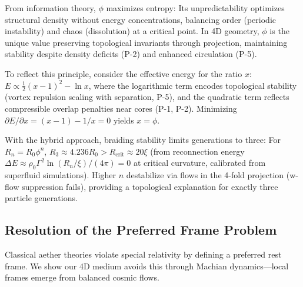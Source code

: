 From information theory, $\phi$ maximizes entropy: Its unpredictability optimizes structural density without energy concentrations, balancing order (periodic instability) and chaos (dissolution) at a critical point. In 4D geometry, $\phi$ is the unique value preserving topological invariants through projection, maintaining stability despite density deficits (P-2) and enhanced circulation (P-5).

To reflect this principle, consider the effective energy for the ratio $x$: $E \propto \frac{1}{2} (x - 1)^2 - \ln x$, where the logarithmic term encodes topological stability (vortex repulsion scaling with separation, P-5), and the quadratic term reflects compressible overlap penalties near cores (P-1, P-2). Minimizing $\partial E / \partial x = (x - 1) - 1/x = 0$ yields $x = \phi$.

With the hybrid approach, braiding stability limits generations to three: For $R_n = R_0 \phi^n$, $R_3 \approx 4.236 R_0 > R_{\text{crit}} \approx 20 \xi$ (from reconnection energy $\Delta E \approx \rho_0 \Gamma^2 \ln(R_n / \xi) / (4\pi) = 0$ at critical curvature, calibrated from superfluid simulations). Higher $n$ destabilize via flows in the 4-fold projection (w-flow suppression fails), providing a topological explanation for exactly three particle generations.

\medskip
\noindent
{}
\medskip

\subsection{Resolution of the Preferred Frame Problem}

Classical aether theories violate special relativity by defining a preferred rest frame. We show our 4D medium avoids this through Machian dynamics---local frames emerge from balanced cosmic flows.

